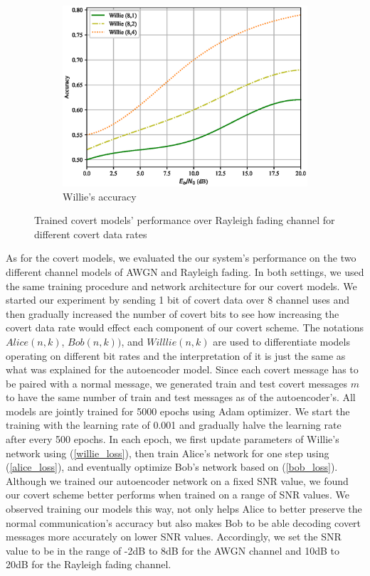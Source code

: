 \begin{figure}[tp!]
\begin{subfigure}{0.3\textwidth}
		\includegraphics[width=\linewidth]{figs/willie_accuracy_rayleigh}
		\caption{Willie's accuracy}
		\label{fig:rayleigh_resutls_willie}
	\end{subfigure}
	\caption{Trained covert models' performance over Rayleigh fading channel for different covert data rates}
	\label{fig:rayleigh_resutls}
\end{figure}
As for the covert models, we evaluated the our system's performance on the two different channel models of AWGN and Rayleigh fading. In both settings, we used the same training procedure and network architecture for our covert models. We started our experiment by sending 1 bit of covert data over 8 channel uses and then gradually increased the number of covert bits to see how increasing the covert data rate would effect each component of our covert scheme. The notations \(Alice (n,k)\), \(Bob (n,k))\), and \(Willlie (n,k)\) are used to differentiate models operating on different bit rates and the interpretation of it is just the same as what was explained for the autoencoder model. Since each covert message has to be paired with a normal message, we generated train and test covert messages \(m\) to have the same number of train and test messages as of the autoencoder's. All models are jointly trained for 5000 epochs using Adam optimizer. We start the training with the learning rate of 0.001 and gradually halve the learning rate after every 500 epochs. In each epoch, we first update parameters of Willie's network using (\ref{willie_loss}), then train Alice's network for one step using (\ref{alice_loss}), and eventually optimize Bob's network based on (\ref{bob_loss}). Although we trained our autoencoder network on a fixed SNR value, we found our covert scheme better performs when trained on a range of SNR values. We observed training our models this way, not only helps Alice to better preserve the normal communication's accuracy but also makes Bob to be able decoding covert messages more accurately on lower SNR values. Accordingly, we set the SNR value to be in the range of -2dB to 8dB for the AWGN channel and 10dB to 20dB for the Rayleigh fading channel.

